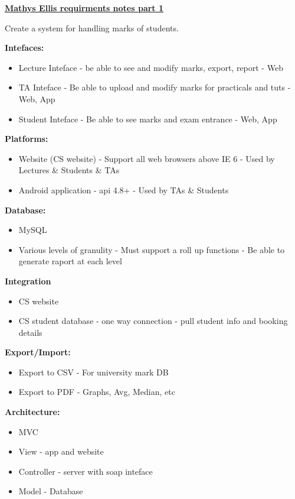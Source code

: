 \documentclass{article}
\begin{document}
\textbf{\underline{Mathys Ellis requirments notes part 1}}

Create a system for handling marks of students.

\textbf{Intefaces:}
\begin{itemize}
\item Lecture Inteface - be able to see and modify marks, export, report - Web
\item TA Inteface - Be able to upload and modify marks for practicals and tuts - Web, App
\item Student Inteface - Be able to see marks and exam entrance - Web, App
\end{itemize}

\textbf{Platforms:}
\begin{itemize}
\item Website (CS website) - Support all web browsers above IE 6 - Used by Lectures \& Students \& TAs
\item Android application - api 4.8+ - Used by TAs \& Students
\end{itemize}

\textbf{Database:}
\begin{itemize}
\item MySQL
\item Various levels of granulity - Must support a roll up functions - Be able to generate raport at each level
\end{itemize}

\textbf{Integration}
\begin{itemize}
\item CS website
\item CS student database - one way connection - pull student info and booking details
\end{itemize}

\textbf{Export/Import:}
\begin{itemize}
\item Export to CSV - For university mark DB
\item Export to PDF - Graphs, Avg, Median, etc
\end{itemize}

\textbf{Architecture:}
\begin{itemize}
\item MVC
\item View - app and website
\item Controller - server with soap inteface
\item Model - Database
\end{itemize}
\end{document}
